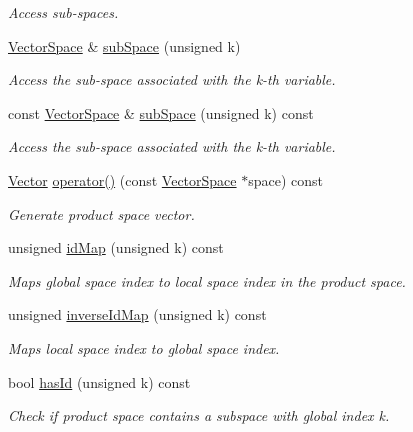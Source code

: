\begin{DoxyCompactItemize}
\begin{DoxyCompactList}\small\item\em Access sub-\/spaces. \end{DoxyCompactList}\item 
\hyperlink{classSpacy_1_1VectorSpace}{Vector\-Space} \& \hyperlink{classSpacy_1_1ProductSpace_1_1VectorCreator_aa61f9413eb3537879a92823dfdd0d6da}{sub\-Space} (unsigned k)
\begin{DoxyCompactList}\small\item\em Access the sub-\/space associated with the k-\/th variable. \end{DoxyCompactList}\item 
const \hyperlink{classSpacy_1_1VectorSpace}{Vector\-Space} \& \hyperlink{classSpacy_1_1ProductSpace_1_1VectorCreator_a4a74b3d51f41ba2ec1c6e755c520a5cc}{sub\-Space} (unsigned k) const 
\begin{DoxyCompactList}\small\item\em Access the sub-\/space associated with the k-\/th variable. \end{DoxyCompactList}\item 
\hyperlink{classSpacy_1_1ProductSpace_1_1Vector}{Vector} \hyperlink{classSpacy_1_1ProductSpace_1_1VectorCreator_a733adf12a3b60abc8b93b8a1476c5e8a}{operator()} (const \hyperlink{classSpacy_1_1VectorSpace}{Vector\-Space} $\ast$space) const 
\begin{DoxyCompactList}\small\item\em Generate product space vector. \end{DoxyCompactList}\item 
unsigned \hyperlink{classSpacy_1_1ProductSpace_1_1VectorCreator_a9995b95ffd41f3a5281d8db28e95e2d8}{id\-Map} (unsigned k) const 
\begin{DoxyCompactList}\small\item\em Maps global space index to local space index in the product space. \end{DoxyCompactList}\item 
unsigned \hyperlink{classSpacy_1_1ProductSpace_1_1VectorCreator_abfd2a000f770f0511dc864c43233a534}{inverse\-Id\-Map} (unsigned k) const 
\begin{DoxyCompactList}\small\item\em Maps local space index to global space index. \end{DoxyCompactList}\item 
\hypertarget{classSpacy_1_1ProductSpace_1_1VectorCreator_af548ea11a6e7f6a5c0cb78bfa7895f4a}{bool \hyperlink{classSpacy_1_1ProductSpace_1_1VectorCreator_af548ea11a6e7f6a5c0cb78bfa7895f4a}{has\-Id} (unsigned k) const }\label{classSpacy_1_1ProductSpace_1_1VectorCreator_af548ea11a6e7f6a5c0cb78bfa7895f4a}

\begin{DoxyCompactList}\small\item\em Check if product space contains a subspace with global index k. \end{DoxyCompactList}\end{DoxyCompactItemize}



